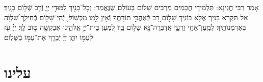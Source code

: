 \documentclass[twoside, openany, parskip=half, 11pt]{book}
\begin{document}
{\vspace{-.3\baselineskip}
אָמַר רַבִּי חֲנִינָא: תַּלְמִידֵי חֲכָמִים מַרְבִּים שָׁלוֹם בָּעוֹלָם שֶׁנֶּאֱמַר: וְכׇל־בָּנַ֖יִךְ לִמּוּדֵ֣י יְיָ֑ וְֿרַ֖ב שְֿׁל֥וֹם בָּנָֽיִךְ׃ אַל תִּקְרָא בָּנַֽיִךְ אֶלָּא בּוֹנַֽיִךְ שָׁל֣וֹם רָ֭ב לְֿאֹֽהֲבֵ֣י תוֹרָתֶ֑ךָ וְֿאֵ֖ין לָ֣מוֹ מִכְשֽׁוֹל׃  ֖ יְֿהִֽי־שָׁל֥וֹם בְּֿחֵילֵ֑ךְ שַׁ֝לְוָ֗ה בְּֿאַרְמְֿנוֹתָֽיִךְ׃ לְֿמַֽעַן־אַחַ֥י וְֿרֵעָ֑י אֲדַבְּֿרָה־נָּ֖א שָׁל֣וֹם בָּֽךְ׃ לְֿ֭מַעַן בֵּית־יְיָ֣ אֱלֹהֵ֑ינוּ אֲבַקְשָׁ֖ה ט֣וֹב לָֽךְ׃ יְיָ֗ עֹ֖ז לְֿעַמּ֣וֹ יִתֵּ֑ן יְיָ֓ יְֿבָרֵ֖ךְ אֶת־עַמּ֣וֹ בַֿשָּׁלֽוֹם׃

\rabbiskaddish

\section*{ עלינו }

\aleinu
}

\siyyumshabbatYT

\vspace{-1\baselineskip}
\end{document}
